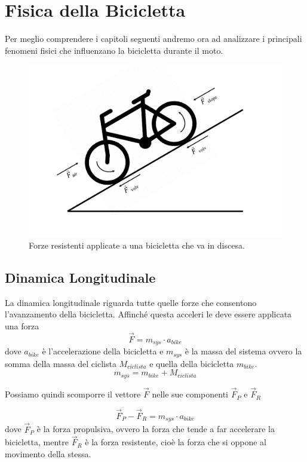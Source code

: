 \documentclass[class=article]{standalone}
\begin{document}
	
	\section{Fisica della Bicicletta}
	Per meglio comprendere i capitoli seguenti andremo ora ad analizzare i principali fenomeni fisici che influenzano la bicicletta durante il moto.
	
	\begin{center}
		\begin{figure}[h!]
			\centering\includegraphics[width=.8\textwidth]{img/potenze}
			\caption[]{Forze resistenti applicate a una bicicletta che va in discesa.}
			\label{fig:potenze}
		\end{figure}
	\end{center}
	
	\subsection{Dinamica Longitudinale}
	La dinamica longitudinale riguarda tutte quelle forze che consentono l'avanzamento della bicicletta. Affinché questa acceleri le deve essere applicata una forza
	\[\vec{F}=m_{sys}\cdot a_{bike}\]
	dove \(a_{bike}\) è l'accelerazione della bicicletta e \(m_{sys}\) è la massa del sistema ovvero la somma della massa del ciclista \(M_{ciclista}\) e quella della bicicletta \(m_{bike}\).
	\[m_{sys}=m_{bike}+M_{ciclista}\]
	
	Possiamo quindi scomporre il vettore \(\vec{F}\) nelle sue componenti \(\vec{F}_{P}\) e \(\vec{F}_{R}\)
	
	\[\vec{F}_{P}-\vec{F}_{R}=m_{sys}\cdot a_{bike}\]
	dove \(\vec{F}_{P}\) è la forza propulsiva, ovvero la forza che tende a far accelerare la bicicletta, mentre \(\vec{F}_{R}\) è la forza resistente, cioè la forza che si oppone al movimento della stessa.
	
\end{document}
